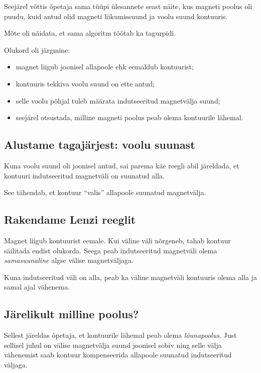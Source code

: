 \documentclass[a4paper,11pt]{article}
\begin{document}
Seejärel võttis õpetaja sama tüüpi ülesannete seast näite, kus magneti poolus oli puudu, kuid antud olid magneti liikumissuund ja voolu suund kontuuris.

Mõte oli näidata, et sama algoritm töötab ka tagurpidi.

Olukord oli järgmine:

\begin{itemize}
    \item magnet liigub joonisel allapoole ehk eemaldub kontuurist;
    \item kontuuris tekkiva voolu suund on ette antud;
    \item selle voolu põhjal tuleb määrata indutseeritud magnetvälja suund;
    \item seejärel otsustada, milline magneti poolus peab olema kontuurile lähemal.
\end{itemize}

\subsection{Alustame tagajärjest: voolu suunast}

Kuna voolu suund oli joonisel antud, sai parema käe reegli abil järeldada, et kontuuri indutseeritud magnetväli on suunatud alla.

See tähendab, et kontuur ``valis'' allapoole suunatud magnetvälja.

\subsection{Rakendame Lenzi reeglit}

Magnet liigub kontuurist eemale. Kui väline väli nõrgeneb, tahab kontuur säilitada endist olukorda. Seega peab indutseeritud magnetväli olema \emph{samasuunaline} algse välise magnetväljaga.

Kuna indutseeritud väli on alla, peab ka väline magnetväli kontuuris olema alla ja samal ajal vähenema.

\subsection{Järelikult milline poolus?}

Sellest järeldas õpetaja, et kontuurile lähemal peab olema \emph{lõunapoolus}. Just sellisel juhul on välise magnetvälja suund joonisel sobiv ning selle välja vähenemist saab kontuur kompenseerida allapoole suunatud indutseeritud väljaga.
\end{document}
